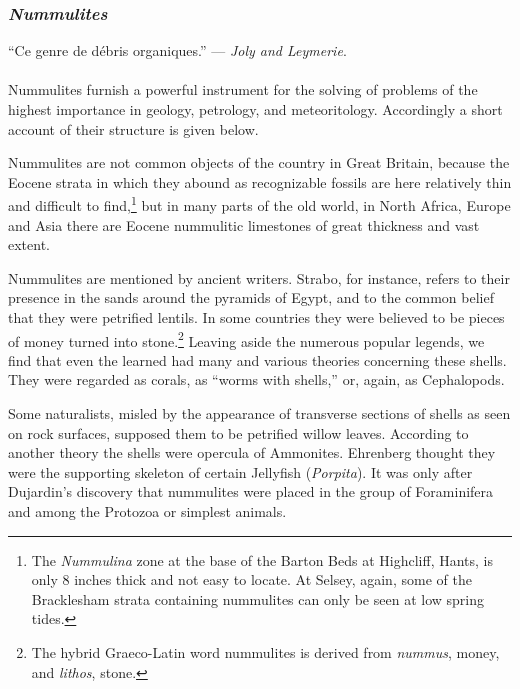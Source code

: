 \documentclass[a4paper, 12pt, oneside]{article}
\begin{document}
\subsubsection{\emph{Nummulites}}
\begin{displayquote}
``Ce genre de débris organiques.'' --- \emph{Joly and Leymerie}.
\end{displayquote}
\paragraph{}
Nummulites furnish a powerful instrument for the solving of problems of the highest importance in geology, petrology, and meteoritology. Accordingly a short account of their structure is given below.

Nummulites are not common objects of the country in Great Britain, because the Eocene strata in which they abound as recognizable fossils are here relatively thin and difficult to find,\footnote{The \emph{Nummulina} zone at the base of the Barton Beds at Highcliff, Hants, is only 8 inches thick and not easy to locate. At Selsey, again, some of the Bracklesham strata containing nummulites can only be seen at low spring tides.} but in many parts of the old world, in North Africa, Europe and Asia there are Eocene nummulitic limestones of great thickness and vast extent.

Nummulites are mentioned by ancient writers. Strabo, for instance, refers to their presence in the sands around the pyramids of Egypt, and to the common belief that they were petrified lentils. In some countries they were believed to be pieces of money turned into stone.\footnote{The hybrid Graeco-Latin word nummulites is derived from \emph{nummus}, money, and \emph{lithos}, stone.} Leaving aside the numerous popular legends, we find that even the learned had many and various theories concerning these shells. They were regarded as corals, as ``worms with shells,'' or, again, as Cephalopods.

Some naturalists, misled by the appearance of transverse sections of shells as seen on rock surfaces, supposed them to be petrified willow leaves. According to another theory the shells were opercula of Ammonites. Ehrenberg thought they were the supporting skeleton of certain Jellyfish (\emph{Porpita}). It was only after Dujardin's discovery that nummulites were placed in the group of Foraminifera and among the Protozoa or simplest animals.
\end{document}
